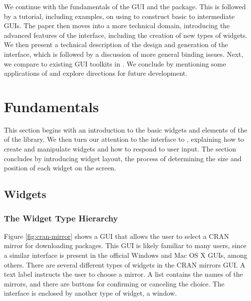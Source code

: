 \documentclass[article]{jss}
\begin{document}
We continue with the fundamentals of the  GUI and the  
package. This is followed by a tutorial, including examples, on using 
 to construct basic to intermediate GUIs. The paper then moves into 
a more technical domain, introducing the advanced features of the interface, 
including the creation of new types of widgets. We then present a technical 
description of the design and generation of
the interface, which is followed by a discussion of more general binding issues.
Next, we compare  to existing GUI toolkits in . We conclude
by mentioning some applications of  and explore directions for future development.

\section{Fundamentals}

This section begins with an introduction to the basic widgets and
elements of the of the  library.
We then turn our attention to the  interface to 
, explaining how to create and manipulate widgets and how to respond to
user input. The section concludes by introducing widget layout, the process
of determining the size and position of each widget on the screen.


\subsection[GTK+ Widgets]{ Widgets}

\subsubsection{The Widget Type Hierarchy}

Figure \ref{fig:cran-mirror} shows a  GUI that allows the user to
select a CRAN mirror for downloading  packages.
This GUI is likely familiar to many  users, since a similar interface
is present in the official Windows and Mac OS X  GUIs, among others.
There are several different types of widgets in the CRAN mirrors GUI. A
text label instructs the user to choose a mirror.  A list contains the 
names of the mirrors, and there are buttons for confirming or canceling the choice. 
The interface is enclosed by another type of widget, a window. 
\end{document}
